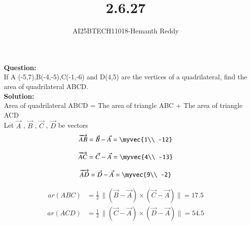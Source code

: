 \documentclass[journal]{IEEEtran}
\begin{document}

\vspace{3cm}

\title{2.6.27}
\author{AI25BTECH11018-Hemanth Reddy}
 \maketitle
{\let\newpage\relax\maketitle}

\renewcommand{\thefigure}{\theenumi}
\renewcommand{\thetable}{\theenumi}
\setlength{\intextsep}{10pt} %


\renewcommand{\thetable}{\theenumi}

\textbf{Question:}\\
If A (-5,7),B(-4,-5),C(-1,-6) and D(4,5) are the vertices of a quadrilateral, find
 the area of quadrilateral ABCD.\\
\textbf{Solution:}\\

Area of quadrilateral ABCD = The area of triangle ABC + The area of triangle ACD\\Let 
$\vec{A}$ ,
$\vec{B}$ ,
$\vec{C}$ ,
$\vec{D}$ 
be vectors\\
\begin{align}
    \overrightarrow{AB} =   \vec{B}  -  \vec{A}  =  \myvec{1\\
-12}
\end{align}

\begin{align}
    \overrightarrow{AC}  =   \vec{C}   -   \vec{A}   =  \myvec{4\\
-13}
\end{align}
 
\begin{align}
    \overrightarrow{AD}  =   \vec{D}   -   \vec{A}   =  \myvec{9\\
-2}
\end{align}

\begin{align}
ar(ABC) &= \frac{1}{2} \, \|(\vec{B} - \vec{A}) \times (\vec{C} - \vec{A}) \|  =  17.5
\end{align}
\begin{align}
ar(ACD) &= \frac{1}{2} \, \|(\vec{C} - \vec{A}) \times (\vec{D} - \vec{A}) \|  =  54.5
\end{align}
\end{document}
